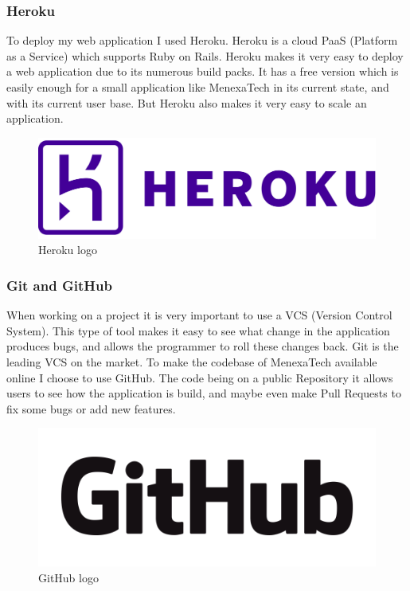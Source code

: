 \documentclass[12pt,a4paper]{article}
\begin{document}
\subsubsection{Heroku}
To deploy my web application I used Heroku. Heroku is a cloud PaaS (Platform as
a Service) which supports Ruby on Rails. Heroku makes it very easy to deploy a
web application due to its numerous build packs. It has a free version which is
easily enough for a small application like MenexaTech in its current state, and
with its current user base. But Heroku also makes it very easy to scale an
application.

\begin{figure}[h]
   \centering
   \includegraphics[scale=0.05]{src/heroku_logo.png}
   \caption{\label{fig:hlogo} Heroku logo}
\end{figure}


\subsubsection{Git and GitHub}
When working on a project it is very important to use a VCS (Version Control
System). This type of tool makes it easy to see what change in the application
produces bugs, and allows the programmer to roll these changes back. Git is the
leading VCS on the market. To make the codebase of MenexaTech available online
I choose to use GitHub. The code being on a public Repository it allows users
to see how the application is build, and maybe even make Pull Requests to fix
some bugs or add new features.

\begin{figure}[h]
   \centering
   \includegraphics[scale=0.15]{src/github_logo.png}
   \caption{\label{fig:ghlogo} GitHub logo}
\end{figure}
\end{document}
